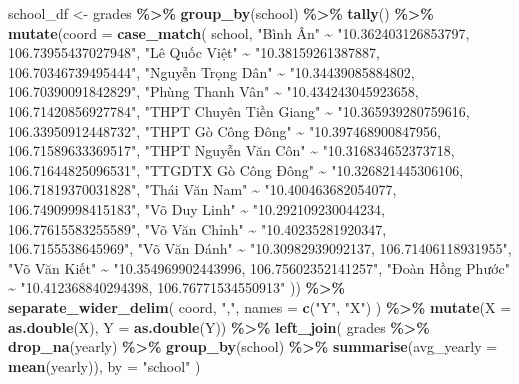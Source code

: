 \documentclass[
]{article}
\newenvironment{Shaded}{\begin{snugshade}}{\end{snugshade}}
\newcommand{\AttributeTok}[1]{\textcolor[rgb]{0.13,0.29,0.53}{#1}}
\newcommand{\FunctionTok}[1]{\textcolor[rgb]{0.13,0.29,0.53}{\textbf{#1}}}
\newcommand{\NormalTok}[1]{#1}
\newcommand{\OtherTok}[1]{\textcolor[rgb]{0.56,0.35,0.01}{#1}}
\newcommand{\SpecialCharTok}[1]{\textcolor[rgb]{0.81,0.36,0.00}{\textbf{#1}}}
\newcommand{\StringTok}[1]{\textcolor[rgb]{0.31,0.60,0.02}{#1}}
\begin{document}
\begin{Shaded}
\begin{Highlighting}[]
\NormalTok{school\_df }\OtherTok{\textless{}{-}}\NormalTok{ grades }\SpecialCharTok{\%\textgreater{}\%}
  \FunctionTok{group\_by}\NormalTok{(school) }\SpecialCharTok{\%\textgreater{}\%}
  \FunctionTok{tally}\NormalTok{() }\SpecialCharTok{\%\textgreater{}\%}
  \FunctionTok{mutate}\NormalTok{(}\AttributeTok{coord =} \FunctionTok{case\_match}\NormalTok{(}
\NormalTok{    school,}
    \StringTok{"Bình Ân"} \SpecialCharTok{\textasciitilde{}} \StringTok{"10.362403126853797, 106.73955437027948"}\NormalTok{,}
    \StringTok{"Lê Quốc Việt"} \SpecialCharTok{\textasciitilde{}} \StringTok{"10.38159261387887, 106.70346739495444"}\NormalTok{,}
    \StringTok{"Nguyễn Trọng Dân"} \SpecialCharTok{\textasciitilde{}} \StringTok{"10.34439085884802, 106.70390091842829"}\NormalTok{,}
    \StringTok{"Phùng Thanh Vân"} \SpecialCharTok{\textasciitilde{}} \StringTok{"10.434243045923658, 106.71420856927784"}\NormalTok{,}
    \StringTok{"THPT Chuyên Tiền Giang"} \SpecialCharTok{\textasciitilde{}} \StringTok{"10.365939280759616, 106.33950912448732"}\NormalTok{,}
    \StringTok{"THPT Gò Công Đông"} \SpecialCharTok{\textasciitilde{}} \StringTok{"10.397468900847956, 106.71589633369517"}\NormalTok{,}
    \StringTok{"THPT Nguyễn Văn Côn"} \SpecialCharTok{\textasciitilde{}} \StringTok{"10.316834652373718, 106.71644825096531"}\NormalTok{,}
    \StringTok{"TTGDTX Gò Công Đông"} \SpecialCharTok{\textasciitilde{}} \StringTok{"10.326821445306106, 106.71819370031828"}\NormalTok{,}
    \StringTok{"Thái Văn Nam"} \SpecialCharTok{\textasciitilde{}} \StringTok{"10.400463682054077, 106.74909998415183"}\NormalTok{,}
    \StringTok{"Võ Duy Linh"} \SpecialCharTok{\textasciitilde{}} \StringTok{"10.292109230044234, 106.77615583255589"}\NormalTok{,}
    \StringTok{"Võ Văn Chỉnh"} \SpecialCharTok{\textasciitilde{}} \StringTok{"10.40235281920347, 106.7155538645969"}\NormalTok{,}
    \StringTok{"Võ Văn Dánh"} \SpecialCharTok{\textasciitilde{}} \StringTok{"10.30982939092137, 106.71406118931955"}\NormalTok{,}
    \StringTok{"Võ Văn Kiết"} \SpecialCharTok{\textasciitilde{}} \StringTok{"10.354969902443996, 106.75602352141257"}\NormalTok{,}
    \StringTok{"Đoàn Hồng Phước"} \SpecialCharTok{\textasciitilde{}} \StringTok{"10.412368840294398, 106.76771534550913"}
\NormalTok{  )) }\SpecialCharTok{\%\textgreater{}\%}
  \FunctionTok{separate\_wider\_delim}\NormalTok{(}
\NormalTok{    coord, }\StringTok{","}\NormalTok{,}
    \AttributeTok{names =} \FunctionTok{c}\NormalTok{(}\StringTok{"Y"}\NormalTok{, }\StringTok{"X"}\NormalTok{)}
\NormalTok{  ) }\SpecialCharTok{\%\textgreater{}\%}
  \FunctionTok{mutate}\NormalTok{(}\AttributeTok{X =} \FunctionTok{as.double}\NormalTok{(X), }\AttributeTok{Y =} \FunctionTok{as.double}\NormalTok{(Y)) }\SpecialCharTok{\%\textgreater{}\%}
  \FunctionTok{left\_join}\NormalTok{(}
\NormalTok{    grades }\SpecialCharTok{\%\textgreater{}\%}
      \FunctionTok{drop\_na}\NormalTok{(yearly) }\SpecialCharTok{\%\textgreater{}\%}
      \FunctionTok{group\_by}\NormalTok{(school) }\SpecialCharTok{\%\textgreater{}\%}
      \FunctionTok{summarise}\NormalTok{(}\AttributeTok{avg\_yearly =} \FunctionTok{mean}\NormalTok{(yearly)),}
    \AttributeTok{by =} \StringTok{"school"}
\NormalTok{  )}


\end{Highlighting}
\end{Shaded}
\end{document}
